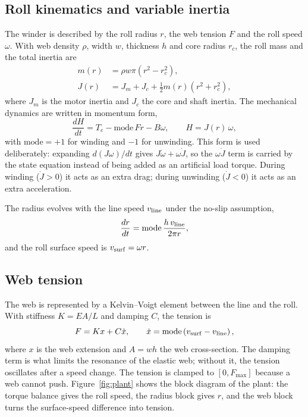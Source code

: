 \documentclass[12pt,a4paper,onecolumn]{IEEEtran}
\begin{document}
\subsection{Roll kinematics and variable inertia}
The winder is described by the roll radius $r$, the web tension $F$ and the roll speed $\omega$. With web density $\rho$, width $w$, thickness $h$ and core radius $r_c$, the roll mass and the total inertia are
\begin{align}
m(r) &= \rho w \pi \left(r^2-r_c^2\right), \label{eq:mass}\\
J(r) &= J_m + J_c + \tfrac12 m(r)\left(r^2+r_c^2\right), \label{eq:J}
\end{align}
where $J_m$ is the motor inertia and $J_c$ the core and shaft inertia. The mechanical dynamics are written in momentum form,
\begin{equation}
\frac{dH}{dt}=T_e-\mathrm{mode}\,F r-B\omega,\qquad H=J(r)\,\omega, \label{eq:mom}
\end{equation}
with $\mathrm{mode}=+1$ for winding and $-1$ for unwinding. This form is used deliberately: expanding $d(J\omega)/dt$ gives $J\dot\omega+\omega\dot J$, so the $\omega\dot J$ term is carried by the state equation instead of being added as an artificial load torque. During winding ($\dot J>0$) it acts as an extra drag; during unwinding ($\dot J<0$) it acts as an extra acceleration.

The radius evolves with the line speed $v_{\rm line}$ under the no-slip assumption,
\begin{equation}
\frac{dr}{dt}=\mathrm{mode}\,\frac{h\,v_{\rm line}}{2\pi r}, \label{eq:r}
\end{equation}
and the roll surface speed is $v_{\rm surf}=\omega r$.

\subsection{Web tension}
The web is represented by a Kelvin--Voigt element \cite{findley1989} between the line and the roll. With stiffness $K=EA/L$ and damping $C$, the tension is
\begin{equation}
F=Kx+C\dot x,\qquad \dot x=\mathrm{mode}\left(v_{\rm surf}-v_{\rm line}\right), \label{eq:web}
\end{equation}
where $x$ is the web extension and $A=wh$ the web cross-section. The damping term is what limits the resonance of the elastic web; without it, the tension oscillates after a speed change. The tension is clamped to $[0,F_{\max}]$ because a web cannot push. Figure~\ref{fig:plant} shows the block diagram of the plant: the torque balance gives the roll speed, the radius block gives $r$, and the web block turns the surface-speed difference into tension.
\end{document}
